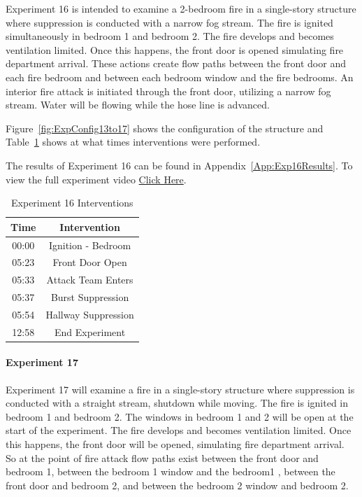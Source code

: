 \documentclass[12pt,oneside]{book}
\begin{document}
Experiment 16 is intended to examine a 2-bedroom fire in a single-story structure where suppression is conducted with a narrow fog stream. The fire is ignited simultaneously in bedroom 1 and bedroom 2. The fire develops and becomes ventilation limited. Once this happens, the front door is opened simulating fire department arrival. These actions create flow paths between the front door and each fire bedroom and between each bedroom window and the fire bedrooms. An interior fire attack is initiated through the front door, utilizing a narrow fog stream. Water will be flowing while the hose line is advanced. 

Figure~\ref{fig:ExpConfig13to17} shows the configuration of the structure and Table~\ref{Table:Exp16Interventions} shows at what times interventions were performed. 

The results of Experiment 16 can be found in Appendix~\ref{App:Exp16Results}. To view the full experiment video \href{https://youtu.be/gl8rc1Nsl1k}{Click Here}.

\begin{table}[H]
	\centering
	\caption{Experiment 16 Interventions}
	\begin{tabular}{|c|c|} 
		\hline
		Time & Intervention \\ \hline \hline
		00:00 & Ignition - Bedroom \\ \hline
		05:23 & Front Door Open \\ \hline
		05:33 & Attack Team Enters\\ \hline
		05:37 & Burst Suppression \\ \hline 
		05:54 & Hallway Suppression \\ \hline
		12:58 & End Experiment\\ \hline
	\end{tabular}
	\label{Table:Exp16Interventions}
\end{table}

\clearpage

\paragraph{Experiment 17} \mbox{}

Experiment 17 will examine a fire in a single-story structure where suppression is conducted with a straight stream, shutdown while moving. The fire is ignited in bedroom 1 and bedroom 2. The windows in bedroom 1 and 2 will be open at the start of the experiment. The fire develops and becomes ventilation limited. Once this happens, the front door will be opened, simulating fire department arrival. So at the point of fire attack flow paths exist between the front door and bedroom 1, between the bedroom 1 window and the bedroom1 , between the front door and bedroom 2, and between the bedroom 2 window and bedroom 2. 
\end{document}
